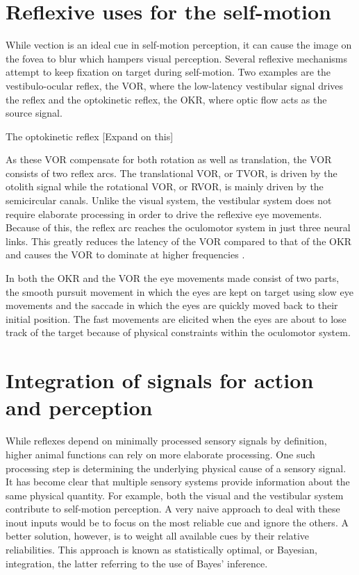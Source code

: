 \section{Reflexive uses for the self-motion}
While vection is an ideal cue in self-motion perception, it can cause the image on the fovea to blur which hampers visual perception. Several reflexive mechanisms attempt to keep fixation on target during self-motion. Two examples are the vestibulo-ocular reflex, the VOR, where the low-latency vestibular signal drives the reflex and the optokinetic reflex, the OKR, where optic flow acts as the source signal.

The optokinetic reflex [Expand on this]

As these VOR compensate for both rotation as well as translation, the VOR consists of two reflex arcs. The translational VOR, or TVOR, is driven by the otolith signal while the rotational VOR, or RVOR, is mainly driven by the semicircular canals. Unlike the visual system, the vestibular system does not require elaborate processing in order to drive the reflexive eye movements. Because of this, the reflex arc reaches the oculomotor system in just three neural links. This greatly reduces the latency of the VOR compared to that of the OKR and causes the VOR to dominate at higher frequencies \cite{schweigart1997}.

In both the OKR and the VOR the eye movements made consist of two parts, the smooth pursuit movement in which the eyes are kept on target using slow eye movements and the saccade in which the eyes are quickly moved back to their initial position. The fast movements are elicited when the eyes are about to lose track of the target because of physical constraints within the oculomotor system.



\section{Integration of signals for action and perception}

While reflexes depend on minimally processed sensory signals by definition, higher animal functions can rely on more elaborate processing. One such processing step is determining the underlying physical cause of a sensory signal. It has become clear that multiple sensory systems provide information about the same physical quantity. For example, both the visual and the vestibular system contribute to self-motion perception. A very naive approach to deal with these inout inputs would be to focus on the most reliable cue and ignore the others. A better solution, however, is to weight all available cues by their  relative reliabilities. This approach is known as statistically optimal, or Bayesian, integration, the latter referring to the use  of Bayes' inference. 

